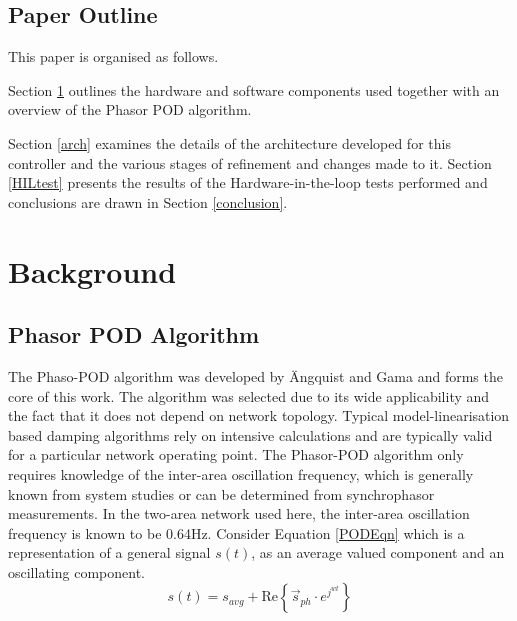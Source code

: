 \documentclass[conference]{IEEEtran}
\begin{document}
\subsection{Paper Outline}
This paper is organised as follows.

Section \ref{background} outlines the hardware and software components used together with an overview of the Phasor POD algorithm.

Section \ref{arch} examines the details of the architecture developed for this controller and the various stages of refinement and changes made to it. Section \ref{HILtest} presents the results of the Hardware-in-the-loop tests performed and conclusions are drawn in Section \ref{conclusion}.

\section{Background}\label{background}

\subsection{Phasor POD Algorithm}
The Phaso-POD algorithm was developed by \"{A}ngquist and Gama\cite{PhasorPOD} and forms the core of this work. The algorithm was selected due to its wide applicability and the fact that it does not depend on network topology. Typical model-linearisation based damping algorithms rely on intensive calculations and are typically valid for a particular network operating point. The Phasor-POD algorithm only requires knowledge of the inter-area oscillation frequency, which is generally known from system studies or can be determined from synchrophasor measurements. In the two-area network used here, the inter-area oscillation frequency is known to be 0.64Hz. Consider Equation \ref{PODEqn} which is a representation of a general signal $s(t)$, as an average valued component and an oscillating component.\\

\begin{equation}
s(t)={s}_{avg}+\mathrm{Re}\left\{{\stackrel{\to }{s}}_{ph}\cdot {e}^{{j}^{wt}}\right\}
\label{PODEqn}
\end{equation}
\end{document}

